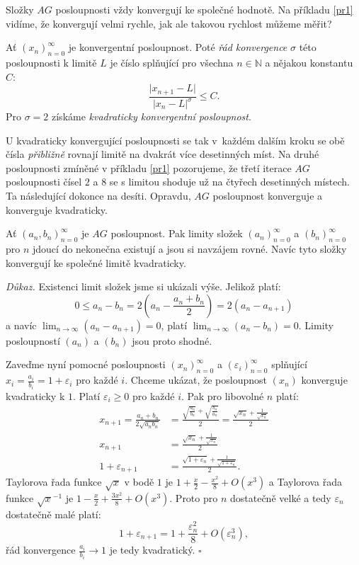 \documentclass[12pt]{report}
\begin{document}
Složky $AG$ posloupnosti vždy konvergují ke společné hodnotě. Na příkladu \ref{pr1} vidíme, že konvergují velmi rychle, jak ale takovou rychlost můžeme měřit?
\begin{definice}
Ať $(x_n)_{n=0}^{\infty}$ je konvergentní posloupnost. Poté \textit{řád konvergence} $\sigma$ této posloupnosti k limitě $L$ je číslo splňující pro všechna $n \in \mathbb{N}$ a nějakou konstantu $C$:
$$\frac{\vert x_{n+1} - L \vert}{\vert x_n - L \vert ^ \sigma} \leqslant C.$$
Pro $\sigma = 2$ získáme \textit{kvadraticky konvergentní posloupnost}. 
\end{definice}

U kvadraticky konvergující posloupnosti se tak v~každém dalším kroku se obě čísla \textit{přibližně} rovnají limitě na dvakrát více desetinných míst. Na druhé posloupnosti zmíněné v příkladu \ref{pr1} pozorujeme, že třetí iterace $AG$ posloupnosti čísel $2$ a $8$ se s limitou shoduje už na čtyřech desetinných místech. Ta následující dokonce na desíti. Opravdu, $AG$ posloupnost konverguje a konverguje kvadraticky.

\begin{veta}\label{conv}
Ať $(a_n,b_n)_{n=0} ^{\infty}$ je $AG$ posloupnost. Pak limity složek $(a_n)_{n=0}^{\infty}$ a $(b_n)_{n=0}^{\infty}$ pro $n$ jdoucí do nekonečna existují a jsou si navzájem rovné. Navíc tyto složky konvergují ke společné limitě kvadraticky.
\end{veta}


\noindent \textit{Důkaz.} Existenci limit složek jsme si ukázali výše. Jelikož platí:
$$ 0 \leqslant a_n - b_n  =  2 \left( a_n - \frac{a_n+ b_n}{2} \right) = 2 ( a_{n} - a_{n+1} )$$
a navíc $\lim_{n \rightarrow \infty} (a_n - a_{n+1}) = 0$, platí $\lim_{n \rightarrow \infty} (a_n - b_n) = 0$. Limity posloupností $(a_n)$ a $(b_n)$ jsou proto shodné.

Zaveďme nyní pomocné posloupnosti $(x_n)_{n=0}^{\infty}$ a $(\varepsilon_i)_{n=0}^{\infty}$ splňující $x_i = \frac{a_i}{b_i} = 1 + \varepsilon_i$ pro každé $i$. Chceme ukázat, že posloupnost $(x_n)$ konverguje kvadraticky k $1$. Platí $\varepsilon_i \geqslant 0$ pro každé $i$. Pak pro libovolné $n$ platí:
\begin{align*}
x_{n+1} = \frac{a_n+b_n}{2 \sqrt{a_n b_n}} &= \frac{\sqrt{\frac{a_n}{b_n}} + \sqrt{\frac{b_n}{a_n}}}{2} = \frac{\sqrt{x_n}+\frac{1}{\sqrt{x_n}}}{2}\\
x_{n+1} &=\frac{\sqrt{x_n}+\frac{1}{\sqrt{x_n}}}{2}\\
1+\varepsilon_{n+1}  &= \frac{\sqrt{1+\varepsilon_n} + \frac{1}{\sqrt{1+\varepsilon_n}}}{2}.
\end{align*}
Taylorova řada funkce $\sqrt{x}$ v bodě $1$ je $1+\frac{x}{2} - \frac{x^2}{8} + O(x^3)$ a Taylorova řada funkce $\sqrt{x}^{-1}$ je $1-\frac{x}{2}+\frac{3 x^2}{8} + O(x^3)$. Proto pro $n$ dostatečně velké a tedy $\varepsilon_n$ dostatečně malé platí:
$$1+\varepsilon_{n+1}  = 1+\frac{\varepsilon_n ^2}{8} + O(\varepsilon_n ^3),$$ 
řád konvergence $\frac{a_i}{b_i} \rightarrow 1$ je tedy kvadratický. \hfill $\square$\\
\end{document}

